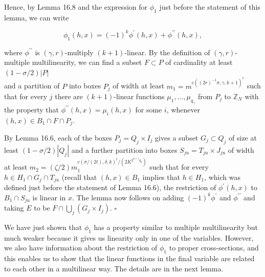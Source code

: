 \documentclass[10pt]{article}
\begin{document}
Hence, by Lemma 16.8 and the expression for $\phi_{1}$ just before the statement of this lemma, we can write

$$
\phi_{1}(h, x)=(-1)^{k}\phi^{\prime}(h, x)+\phi^{\prime \prime}(h, x),
$$

where $\phi^{\prime \prime}$ is $(\gamma, r)$-multiply $(k+1)$-linear. By the definition of $(\gamma, r)$-multiple multilinearity, we can find a subset $F \subset P$ of cardinality at least $(1-\sigma / 2)|P|$\\
and a partition of $P$ into boxes $P_{j}$ of width at least $m_{1}=m^{c\left((2 r)^{-1} \sigma, \gamma, k+1\right)^{r}}$ such that for every $j$ there are $(k+1)$-linear functions $\mu_{1}, \ldots, \mu_{q_{\gamma}}$ from $P_{j}$ to $\mathbb{Z}_{N}$ with the property that $\phi^{\prime \prime}(h, x)=\mu_{i}(h, x)$ for some $i$, whenever $(h, x) \in B_{1} \cap F \cap P_{j}$.

By Lemma 16.6, each of the boxes $P_{j}=Q_{j} \times I_{j}$ gives a subset $G_{j} \subset Q_{j}$ of size at least $(1-\sigma / 2)\left|Q_{j}\right|$ and a further partition into boxes $S_{j u}=T_{j u} \times J_{j u}$ of width at least $m_{2}=(\zeta / 2) m_{1}^{c\left(\sigma/(2t), \delta, k\right)^{t} / \left(2 K^{2^{k+1}q_{\delta}}\right)}$ such that for every $h \in H_{1} \cap G_{j} \cap T_{j u}$ (recall that $(h, x) \in B_{1}$ implies that $h \in H_{1}$, which was defined just before the statement of Lemma 16.6), the restriction of $\phi^{\prime}(h, x)$ to $B_{1} \cap S_{j u}$ is linear in $x$. The lemma now follows on adding $(-1)^{k}\phi^{\prime}$ and $\phi^{\prime \prime}$ and taking $E$ to be $F \cap \bigcup_{j}\left(G_{j} \times I_{j}\right)$. \(\square\)

We have just shown that $\phi_{1}$ has a property similar to multiple multilinearity but much weaker because it gives us linearity only in one of the variables. However, we also have information about the restriction of $\phi_{1}$ to proper cross-sections, and this enables us to show that the linear functions in the final variable are related to each other in a multilinear way. The details are in the next lemma.
\end{document}

